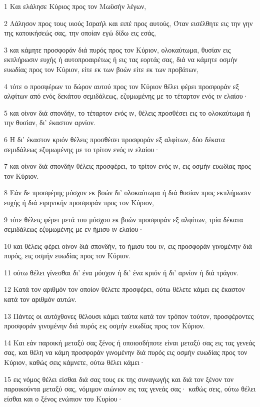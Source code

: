 \par 1 Και ελάλησε Κύριος προς τον Μωϋσήν λέγων,
\par 2 Λάλησον προς τους υιούς Ισραήλ και ειπέ προς αυτούς, Όταν εισέλθητε εις την γην της κατοικήσεώς σας, την οποίαν εγώ δίδω εις εσάς,
\par 3 και κάμητε προσφοράν διά πυρός προς τον Κύριον, ολοκαύτωμα, θυσίαν εις εκπλήρωσιν ευχής ή αυτοπροαιρέτως ή εις τας εορτάς σας, διά να κάμητε οσμήν ευωδίας προς τον Κύριον, είτε εκ των βοών είτε εκ των προβάτων,
\par 4 τότε ο προσφέρων το δώρον αυτού προς τον Κύριον θέλει φέρει προσφοράν εξ αλφίτων από ενός δεκάτου σεμιδάλεως, εζυμωμένης με το τέταρτον ενός ιν ελαίου·
\par 5 και οίνον διά σπονδήν, το τέταρτον ενός ιν, θέλεις προσθέσει εις το ολοκαύτωμα ή την θυσίαν, δι' έκαστον αρνίον.
\par 6 Η δι' έκαστον κριόν θέλεις προσθέσει προσφοράν εξ αλφίτων, δύο δέκατα σεμιδάλεως εζυμωμένης με το τρίτον ενός ιν ελαίου·
\par 7 και οίνον διά σπονδήν θέλεις προσφέρει, το τρίτον ενός ιν, εις οσμήν ευωδίας προς τον Κύριον.
\par 8 Εάν δε προσφέρης μόσχον εκ βοών δι' ολοκαύτωμα ή διά θυσίαν προς εκπλήρωσιν ευχής ή διά ειρηνικήν προσφοράν προς τον Κύριον,
\par 9 τότε θέλεις φέρει μετά του μόσχου εκ βοών προσφοράν εξ αλφίτων, τρία δέκατα σεμιδάλεως εζυμωμένης με εν ήμισυ ιν ελαίου·
\par 10 και θέλεις φέρει οίνον διά σπονδήν, το ήμισυ του ιν, εις προσφοράν γινομένην διά πυρός, εις οσμήν ευωδίας προς τον Κύριον.
\par 11 ούτω θέλει γίνεσθαι δι' ένα μόσχον ή δι' ένα κριόν ή δι' αρνίον ή διά τράγον.
\par 12 Κατά τον αριθμόν τον οποίον θέλετε προσφέρει, ούτω θέλετε κάμει εις έκαστον κατά τον αριθμόν αυτών.
\par 13 Πάντες οι αυτόχθονες θέλουσι κάμει ταύτα κατά τον τρόπον τούτον, προσφέροντες προσφοράν γινομένην διά πυρός εις οσμήν ευωδίας προς τον Κύριον.
\par 14 Και εάν παροική μεταξύ σας ξένος ή οποιοσδήποτε είναι μεταξύ σας εις τας γενεάς σας, και θέλη να κάμη προσφοράν γινομένην διά πυρός εις οσμήν ευωδίας προς τον Κύριον, καθώς σεις κάμνετε, ούτω θέλει κάμει·
\par 15 εις νόμος θέλει είσθαι διά σας τους εκ της συναγωγής και διά τον ξένον τον παροικούντα μεταξύ σας, νόμιμον αιώνιον εις τας γενεάς σας· καθώς σεις, ούτω θέλει είσθαι και ο ξένος ενώπιον του Κυρίου·
